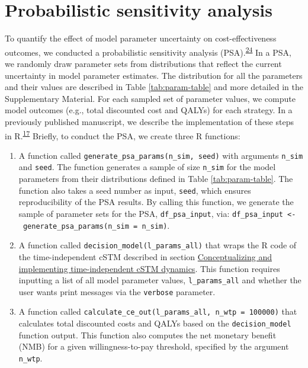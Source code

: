 \documentclass[
]{article}
\providecommand{\tightlist}{%
  \setlength{\itemsep}{0pt}\setlength{\parskip}{0pt}}
\begin{document}
\hypertarget{probabilistic-sensitivity-analysis}{%
\section{Probabilistic sensitivity analysis}\label{probabilistic-sensitivity-analysis}}

To quantify the effect of model parameter uncertainty on cost-effectiveness outcomes, we conducted a probabilistic sensitivity analysis (PSA).\textsuperscript{\protect\hyperlink{ref-Briggs2012}{24}} In a PSA, we randomly draw parameter sets from distributions that reflect the current uncertainty in model parameter estimates. The distribution for all the parameters and their values are described in Table \ref{tab:param-table} and more detailed in the Supplementary Material. For each sampled set of parameter values, we compute model outcomes (e.g., total discounted cost and QALYs) for each strategy. In a previously published manuscript, we describe the implementation of these steps in R.\textsuperscript{\protect\hyperlink{ref-Alarid-Escudero2019e}{17}} Briefly, to conduct the PSA, we create three R functions:

\begin{enumerate}
\def\labelenumi{\arabic{enumi}.}
\tightlist
\item
  A function called \texttt{generate\_psa\_params(n\_sim,\ seed)} with arguments \texttt{n\_sim} and \texttt{seed}. The function generates a sample of size \texttt{n\_sim} for the model parameters from their distributions defined in Table \ref{tab:param-table}. The function also takes a seed number as input, \texttt{seed}, which ensures reproducibility of the PSA results. By calling this function, we generate the sample of parameter sets for the PSA, \texttt{df\_psa\_input}, via: \texttt{df\_psa\_input\ \textless{}-\ generate\_psa\_params(n\_sim\ =\ n\_sim)}.
\item
  A function called \texttt{decision\_model(l\_params\_all)} that wraps the R code of the time-independent cSTM described in section \protect\hyperlink{conceptualizing-and-implementing-time-independent-cSTM-dynamics}{Conceptualizing and implementing time-independent cSTM dynamics}. This function requires inputting a list of all model parameter values, \texttt{l\_params\_all} and whether the user wants print messages via the \texttt{verbose} parameter.
\item
  A function called \texttt{calculate\_ce\_out(l\_params\_all,\ n\_wtp\ =\ 100000)} that calculates total discounted costs and QALYs based on the \texttt{decision\_model} function output. This function also computes the net monetary benefit (NMB) for a given willingness-to-pay threshold, specified by the argument \texttt{n\_wtp}.
\end{enumerate}
\end{document}
